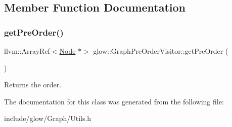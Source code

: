 \subsection{Member Function Documentation}
\mbox{\label{classglow_1_1_graph_pre_order_visitor_aa835bc58821a8d48b43146c0b47500b2}} 
\subsubsection{\texorpdfstring{get\+Pre\+Order()}{getPreOrder()}}
{\footnotesize\ttfamily llvm\+::\+Array\+Ref$<$\hyperlink{classglow_1_1_node}{Node} $\ast$$>$ glow\+::\+Graph\+Pre\+Order\+Visitor\+::get\+Pre\+Order (\begin{DoxyParamCaption}{ }\end{DoxyParamCaption})\hspace{0.3cm}{\ttfamily [inline]}}

\begin{DoxyReturn}{Returns}
the order. 
\end{DoxyReturn}


The documentation for this class was generated from the following file\+:\begin{DoxyCompactItemize}
\item 
include/glow/\+Graph/Utils.\+h\end{DoxyCompactItemize}
